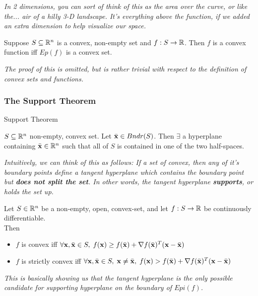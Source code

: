 \textit{In 2 dimensions, you can sort of think of this as the area over the 
curve, or like the... air of a hilly 3-D landscape. 
It's everything above the function, if we added an extra dimension to
help visualize our space.}


\begin{theo}{}{}
Suppose $S \subseteq \mathbb{R}^n$ is a convex, non-empty set
and $f : S \rightarrow \mathbb{R}$. Then $f$ is a convex function iff
$Ep(f)$ is a convex set.
\end{theo}

\textit{The proof of this is omitted, but is rather trivial with respect
to the definition of convex sets and functions.}

\subsubsection{The Support Theorem}

\begin{theo}{Support Theorem}{}

$S \subseteq \mathbb{R}^n$ non-empty, convex set. Let $\bar{\mathbf{x}} \in Bndr(S)$. Then
$\exists$ a hyperplane containing $\bar{\mathbf{x}} \in \mathbb{R}^n$ such that all of $S$ is
contained in one of the two half-spaces.
\end{theo}

\textit{Intuitively, we can think of this as follows: If a set of convex, then any of
it's boundary points define a tangent hyperplane which contains the boundary
point but \textbf{does not split the set}. In other words, the tangent hyperplane
\textbf{supports}, or holds the set up.}

\begin{theo}{}{}
Let $S \in \mathbb{R}^n$ be a non-empty, open, convex-set, and let 
$f: S \rightarrow \mathbb{R}$ be continuously differentiable.
\medskip\\
Then
\begin{itemize}
	\item
		$f$ is convex iff $\forall \mathbf{x}, \bar{\mathbf{x}} \in S , \;
		f(\mathbf{x}) \geq f(\bar{\mathbf{x}}) + \nabla f(\bar{\mathbf{x}})^T(\mathbf{x} - \bar{\mathbf{x}})$
	\item
		$f$ is strictly convex iff $\forall \mathbf{x}, \bar{\mathbf{x}} \in S , \; \mathbf{x} \neq \bar{\mathbf{x}}, \;
		f(\mathbf{x}) > f(\bar{\mathbf{x}}) + \nabla f(\bar{\mathbf{x}})^T(\mathbf{x} - \bar{\mathbf{x}})$
\end{itemize}
\end{theo}

\textit{This is basically showing us that the tangent hyperplane is the only possible
candidate for supporting hyperplane on the boundary of $Epi(f)$.}


